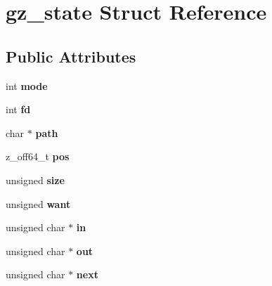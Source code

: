 \hypertarget{structgz__state}{}\section{gz\+\_\+state Struct Reference}
\label{structgz__state}
\subsection*{Public Attributes}
\begin{DoxyCompactItemize}
\item 
int {\bfseries mode}\hypertarget{structgz__state_aaded3d8b2702b1bfabe3141e6f772b1a}{}\label{structgz__state_aaded3d8b2702b1bfabe3141e6f772b1a}

\item 
int {\bfseries fd}\hypertarget{structgz__state_a5963abca9e640ff2aa40b517f9cffc2c}{}\label{structgz__state_a5963abca9e640ff2aa40b517f9cffc2c}

\item 
char $\ast$ {\bfseries path}\hypertarget{structgz__state_ad52b106362f7262800d7224ff90fdd16}{}\label{structgz__state_ad52b106362f7262800d7224ff90fdd16}

\item 
z\+\_\+off64\+\_\+t {\bfseries pos}\hypertarget{structgz__state_a2437a6feaf9c00cb127f5ac360018b9b}{}\label{structgz__state_a2437a6feaf9c00cb127f5ac360018b9b}

\item 
unsigned {\bfseries size}\hypertarget{structgz__state_a36b86ed64aca8f022ec0f3411663fe24}{}\label{structgz__state_a36b86ed64aca8f022ec0f3411663fe24}

\item 
unsigned {\bfseries want}\hypertarget{structgz__state_abee992fb115f9f118377b9f46d14b2a5}{}\label{structgz__state_abee992fb115f9f118377b9f46d14b2a5}

\item 
unsigned char $\ast$ {\bfseries in}\hypertarget{structgz__state_af16c5730c48518809ead34557d612942}{}\label{structgz__state_af16c5730c48518809ead34557d612942}

\item 
unsigned char $\ast$ {\bfseries out}\hypertarget{structgz__state_ad83d10502587255806fd712109867106}{}\label{structgz__state_ad83d10502587255806fd712109867106}

\item 
unsigned char $\ast$ {\bfseries next}\hypertarget{structgz__state_ab0fe46e40d8980befc2033400137db37}{}\label{structgz__state_ab0fe46e40d8980befc2033400137db37}


\end{DoxyCompactItemize}
